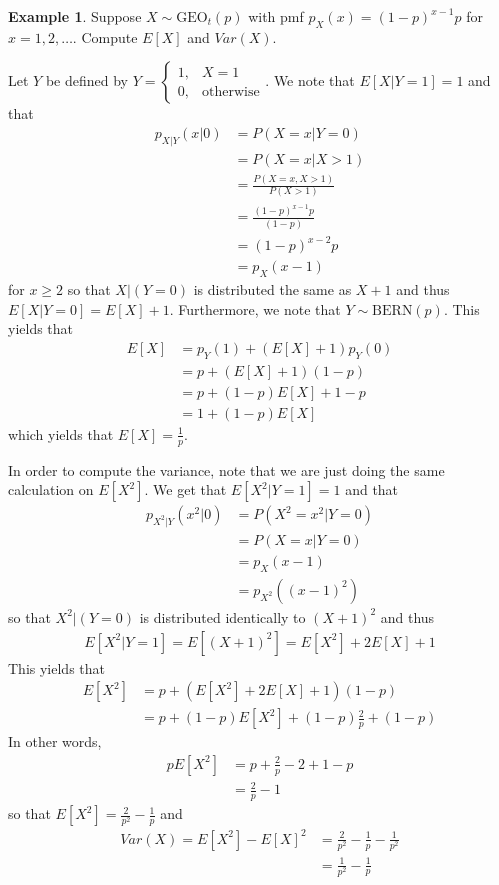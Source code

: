 \documentclass[11pt]{amsart}
\theoremstyle{definition}
\newtheorem{example}[theorem]{Example}
\numberwithin{equation}{section}
\begin{document}
 \begin{example}
     Suppose $X\sim\mathrm{GEO}_t(p)$ with pmf $p_X(x)=(1-p)^{x-1}p$ for $x=1,2,\ldots$. Compute $E[X]$ and $Var(X)$.

     Let $Y$ be defined by $Y=\begin{cases}
         1, & X=1\\
         0, & \text{otherwise}
     \end{cases}$. We note that $E[X|Y=1]=1$ and that
     \begin{align*}
         p_{X|Y}(x|0)&=P(X=x|Y=0)\\
         &=P(X=x|X>1)\\
         &=\frac{P(X=x,X>1)}{P(X>1)}\\
         &=\frac{(1-p)^{x-1}p}{(1-p)}\\
         &=(1-p)^{x-2}p\\
         &=p_X(x-1)
     \end{align*}
     for $x\ge 2$ so that $X|(Y=0)$ is distributed the same as $X+1$ and thus $E[X|Y=0]=E[X]+1$. Furthermore, we note that $Y\sim\mathrm{BERN}(p)$. This yields that 
     \begin{align*}
         E[X]&=p_Y(1)+(E[X]+1)p_Y(0)\\
         &=p+(E[X]+1)(1-p)\\
         &=p+(1-p)E[X]+1-p\\
         &=1+(1-p)E[X]
     \end{align*}
     which yields that $E[X]=\frac{1}{p}$.

     In order to compute the variance, note that we are just doing the same calculation on $E[X^2]$. We get that $E[X^2|Y=1]=1$ and that
     \begin{align*}
         p_{X^2|Y}(x^2|0)&=P(X^2=x^2|Y=0)\\
         &=P(X=x|Y=0)\\
         &=p_X(x-1)\\
         &=p_{X^2}((x-1)^2)
     \end{align*}
     so that $X^2|(Y=0)$ is distributed identically to $(X+1)^2$ and thus 
     \begin{align*}
         E[X^2|Y=1]=E[(X+1)^2]=E[X^2]+2E[X]+1
     \end{align*}
     This yields that 
     \begin{align*}
         E[X^2]&=p+(E[X^2]+2E[X]+1)(1-p)\\
         &=p+(1-p)E[X^2]+(1-p)\frac{2}{p}+(1-p)
     \end{align*}
     In other words,
     \begin{align*}
         pE[X^2]&=p+\frac{2}{p}-2+1-p\\
         &=\frac{2}{p}-1
     \end{align*}
     so that $E[X^2]=\frac{2}{p^2}-\frac{1}{p}$ and 
     \begin{align*}
         Var(X)=E[X^2]-E[X]^2&=\frac{2}{p^2}-\frac{1}{p}-\frac{1}{p^2}\\
         &=\frac{1}{p^2}-\frac{1}{p}
     \end{align*}
 \end{example}
\end{document}
